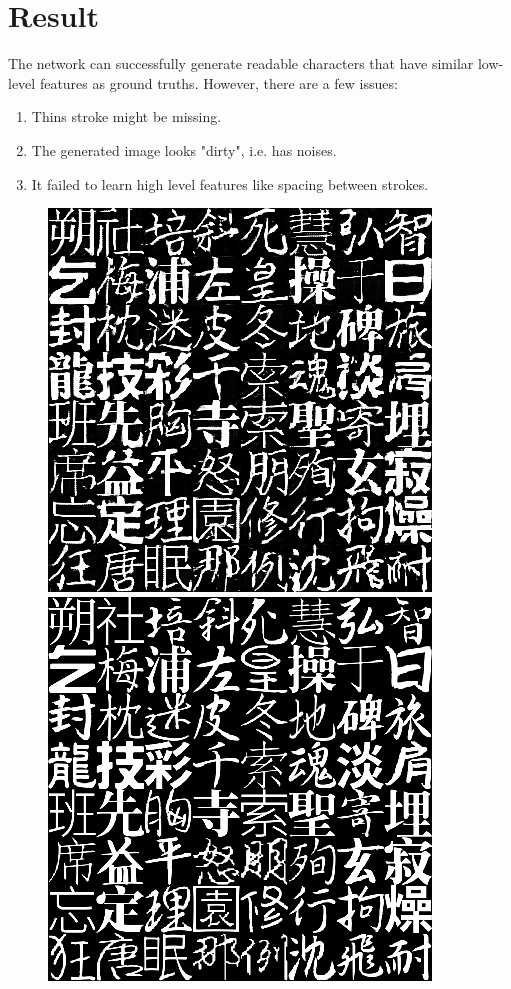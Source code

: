 \documentclass[10pt,twocolumn,letterpaper]{article}
\begin{document}
\section{Result}
The network can successfully generate readable characters that have similar low-level features as ground truths. However, there are a few issues:

\begin{enumerate}
	\item Thins stroke might be missing.
	\item The generated image looks "dirty", i.e. has noises.
	\item It failed to learn high level features like spacing between strokes.
\end{enumerate}


\begin{figure}[t]
	\begin{center}
		\includegraphics[width=0.8\linewidth]{385gen.png}
		\includegraphics[width=0.8\linewidth]{385gt.png}

\end{center}
\end{figure}
\end{document}
